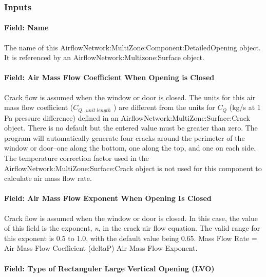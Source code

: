 \subsubsection{Inputs}\label{inputs-4-003}

\paragraph{Field: Name}\label{field-name-4-003}

The name of this Air\-flow\-Net\-work:\-Multi\-Zone:\-Com\-ponent:\-Detailed\-Opening object. It is referenced by an Air\-flow\-Net\-work:\-Multi\-zone:\-Surface object.

\paragraph{Field: Air Mass Flow Coefficient When Opening is Closed}\label{field-air-mass-flow-coefficient-when-opening-is-closed}

Crack flow is assumed when the window or door is closed. The units for this air mass flow coefficient (\({C_{Q,\;unit\;length}}\) ) are different from the units for \({C_Q}\) (kg/s at 1 Pa pressure difference) defined in an Air\-flow\-Net\-work:\-Multi\-Zone:\-Sur\-face:\-Crack object. There is no default but the entered value must be greater than zero. The program will automatically generate four cracks around the perimeter of the window or door--one along the bottom, one along the top, and one on each side. The temperature correction factor used in the Air\-flow\-Net\-work:\-Multi\-Zone:\-Sur\-face:\-Crack object is not used for this component to calculate air mass flow rate.

\paragraph{Field: Air Mass Flow Exponent When Opening Is Closed}\label{field-air-mass-flow-exponent-when-opening-is-closed}

Crack flow is assumed when the window or door is closed. In this case, the value of this field is the exponent, \emph{n}, in the crack air flow equation. The valid range for this exponent is 0.5 to 1.0, with the default value being 0.65. Mass Flow Rate = Air Mass Flow Coefficient (deltaP) Air Mass Flow Exponent.

\paragraph{Field: Type of Rectanguler Large Vertical Opening (LVO)}\label{field-type-of-rectanguler-large-vertical-opening-lvo}

